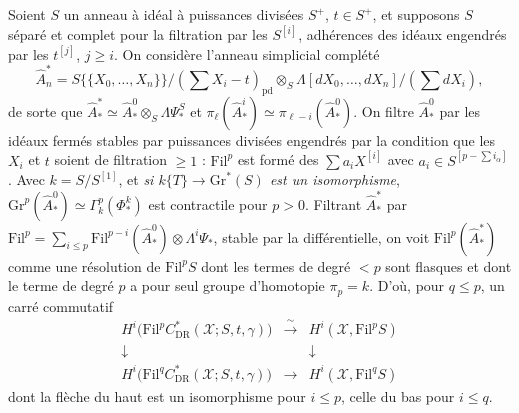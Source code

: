 \documentclass[11pt,a4paper]{article}
\begin{document}
Soient $S$ un anneau à idéal à puissances divisées $S^+$, $t \in S^+$, et
supposons $S$ séparé et complet pour la filtration par les $S^{[i]}$, adhérences
des idéaux engendrés par les $t^{[j]}$, $j \geq i$. On considère l'anneau
simplicial complété
\[
\widehat{A}^*_n = S\{\{X_0,\ldots,X_n\}\}/(\textstyle\sum X_i - t)_{\mathrm{pd}} \otimes_S \Lambda[dX_0,\ldots,dX_n]/(\textstyle\sum dX_i) ,
\]
de sorte que $\widehat{A}^*_* \simeq \widehat{A}^0_* \otimes_S \Lambda\Psi^S_*$
et $\pi_\ell(\widehat{A}^i_*) \simeq \pi_{\ell-i}(\widehat{A}^0_*)$. On filtre
$\widehat{A}^0_*$ par les idéaux fermés stables par puissances divisées
engendrés par la condition que les $X_i$ et $t$ soient de filtration $\geq 1$ :
$\mathrm{Fil}^p$ est formé des $\sum a_{i}X^{[i]}$ avec $a_i \in S^{[p - \sum
i_\alpha]}$. Avec $k = S/S^{[1]}$, et \emph{si $k\{T\} \to \mathrm{Gr}^*(S)$ est
un isomorphisme}, $\mathrm{Gr}^p(\widehat{A}^0_*) \simeq \Gamma^p_k(\Phi^k_*)$ est
contractile pour $p > 0$. Filtrant $\widehat{A}^*_*$ par $\mathrm{Fil}^p =
\sum_{i \leq p} \mathrm{Fil}^{p-i}(\widehat{A}^0_*) \otimes \Lambda^i\Psi_*$,
stable par la différentielle, on voit $\mathrm{Fil}^p(\widehat{A}^*_*)$ comme une
résolution de $\mathrm{Fil}^pS$ dont les termes de degré $< p$ sont flasques et
dont le terme de degré $p$ a pour seul groupe d'homotopie $\pi_p = k$. D'où,
pour $q \leq p$, un carré commutatif
\[
\begin{array}{ccc}
H^i\bigl(\mathrm{Fil}^p C^*_{\mathrm{DR}}(\mathcal{X}; S, t, \gamma)\bigr) & \xrightarrow{\ \sim\ } & H^i(\mathcal{X}, \mathrm{Fil}^pS) \\
\downarrow & & \downarrow \\
H^i\bigl(\mathrm{Fil}^q C^*_{\mathrm{DR}}(\mathcal{X}; S, t, \gamma)\bigr) & \longrightarrow & H^i(\mathcal{X}, \mathrm{Fil}^qS)
\end{array}
\]
dont la flèche du haut est un isomorphisme pour $i \leq p$, celle du bas pour
$i \leq q$.
\end{document}
